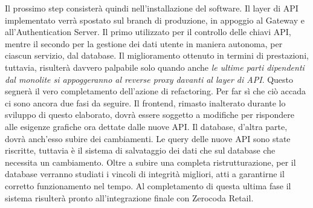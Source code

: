 Il prossimo step consisterà quindi nell'installazione del software. Il layer di API implementato verrà spostato sul branch di produzione, in appoggio al Gateway e all'Authentication Server. Il primo utilizzato per il controllo delle chiavi API, mentre il secondo per la gestione dei dati utente in maniera autonoma, per ciascun servizio, dal database. Il miglioramento ottenuto in termini di prestazioni, tuttavia, risulterà davvero palpabile solo quando anche \emph{le ultime parti dipendenti dal monolite si appoggeranno al reverse proxy davanti al layer di API}. Questo segnerà il vero completamento dell'azione di refactoring. Per far sì che ciò accada ci sono ancora due fasi da seguire. Il frontend, rimasto inalterato durante lo sviluppo di questo elaborato, dovrà essere soggetto a modifiche per rispondere alle esigenze grafiche ora dettate dalle nuove API. Il database, d'altra parte, dovrà anch'esso subire dei cambiamenti. Le query delle nuove API sono state riscritte, tuttavia è il sistema di salvataggio dei dati che sul database che necessita un cambiamento. Oltre a subire una completa ristrutturazione, per il database verranno studiati i vincoli di integrità migliori, atti a garantirne il corretto funzionamento nel tempo. Al completamento di questa ultima fase il sistema risulterà pronto all'integrazione finale con Zerocoda Retail. 